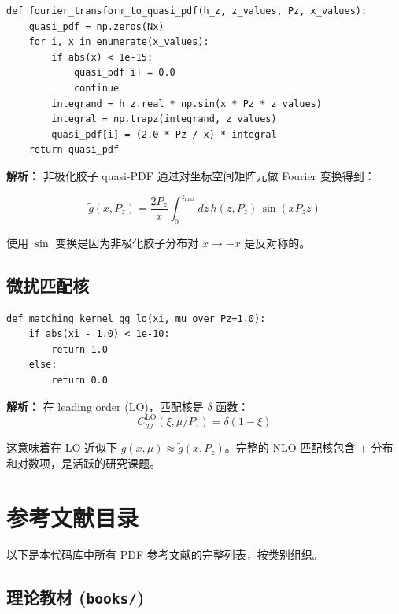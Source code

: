 \documentclass[12pt,a4paper]{ctexart}
\begin{document}
\begin{lstlisting}[caption={Fourier 变换到 quasi-PDF}]
def fourier_transform_to_quasi_pdf(h_z, z_values, Pz, x_values):
    quasi_pdf = np.zeros(Nx)
    for i, x in enumerate(x_values):
        if abs(x) < 1e-15:
            quasi_pdf[i] = 0.0
            continue
        integrand = h_z.real * np.sin(x * Pz * z_values)
        integral = np.trapz(integrand, z_values)
        quasi_pdf[i] = (2.0 * Pz / x) * integral
    return quasi_pdf
\end{lstlisting}

\textbf{解析：}
非极化胶子 quasi-PDF 通过对坐标空间矩阵元做 Fourier 变换得到：

\begin{equation}
\tilde{g}(x, P_z) = \frac{2P_z}{x} \int_0^{z_{\max}} dz \, h(z, P_z) \, \sin(x P_z z)
\end{equation}

使用 $\sin$ 变换是因为非极化胶子分布对 $x \to -x$ 是反对称的。

\subsection{微扰匹配核}

\begin{lstlisting}[caption={LO 匹配核}]
def matching_kernel_gg_lo(xi, mu_over_Pz=1.0):
    if abs(xi - 1.0) < 1e-10:
        return 1.0
    else:
        return 0.0
\end{lstlisting}

\textbf{解析：}
在 leading order (LO)，匹配核是 $\delta$ 函数：
\begin{equation}
C_{gg}^{\text{LO}}(\xi, \mu/P_z) = \delta(1-\xi)
\end{equation}

这意味着在 LO 近似下 $g(x,\mu) \approx \tilde{g}(x, P_z)$。完整的 NLO 匹配核包含 $+$ 分布和对数项，是活跃的研究课题。

\section{参考文献目录}
\label{sec:refs}

以下是本代码库中所有 PDF 参考文献的完整列表，按类别组织。

\subsection{理论教材 (\texttt{books/})}
\end{document}
